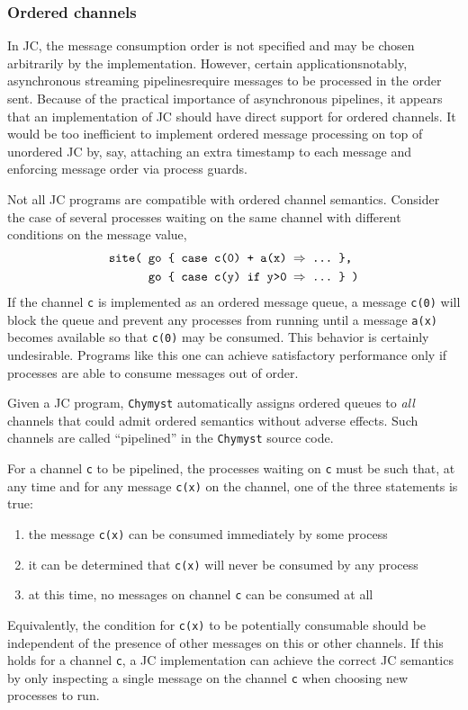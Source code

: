 \documentclass[sigplan,10pt]{acmart}\settopmatter{}
\begin{document}
\subsubsection{Ordered channels}

In JC, the message consumption order is not specified and may be chosen
arbitrarily by the implementation. However, certain applications\textemdash notably,
asynchronous streaming pipelines\textemdash require messages to be
processed in the order sent. Because of the practical importance of
asynchronous pipelines, it appears that an implementation of JC should
have direct support for ordered channels. It would be too inefficient
to implement ordered message processing on top of unordered JC by,
say, attaching an extra timestamp to each message and enforcing message
order via process guards.

Not all JC programs are compatible with ordered channel semantics.
Consider the case of several processes waiting on the same channel
with different conditions on the message value, 
\begin{align*}
\text{\texttt{site( }} & \text{\texttt{go \{ case c(0) + a(x) \ensuremath{\Rightarrow} ...~\},}}\\
 & \text{\text{\texttt{go \{ case c(y) if y>0 }}\texttt{\ensuremath{\Rightarrow} ...~\} )}}
\end{align*}
If the channel \texttt{c} is implemented as an ordered message queue,
a message \texttt{c(0)} will block the queue and prevent any processes
from running until a message \texttt{a(x)} becomes available so that
\texttt{c(0)} may be consumed. This behavior is certainly undesirable.
Programs like this one can achieve satisfactory performance only if
processes are able to consume messages out of order.

Given a JC program, \texttt{Chymyst} automatically assigns ordered
queues to \emph{all} channels that could admit ordered semantics without
adverse effects. Such channels are called ``pipelined'' in the \texttt{Chymyst}
source code.

For a channel \texttt{c} to be pipelined, the processes waiting on
\texttt{c} must be such that, at any time and for any message \texttt{c(x)}
on the channel, one of the three statements is true:
\begin{enumerate}
\item the message \texttt{c(x)} can be consumed immediately by some process
\item it can be determined that \texttt{c(x)} will never be consumed by
any process
\item at this time, no messages on channel \texttt{c} can be consumed at
all
\end{enumerate}
Equivalently, the condition for \texttt{c(x)}
to be potentially consumable should be independent of the presence of other
messages on this or other channels. If this holds for
a channel \texttt{c}, a JC implementation can achieve the correct
JC semantics by only inspecting a single message on the channel \texttt{c}
when choosing new processes to run.
\end{document}

